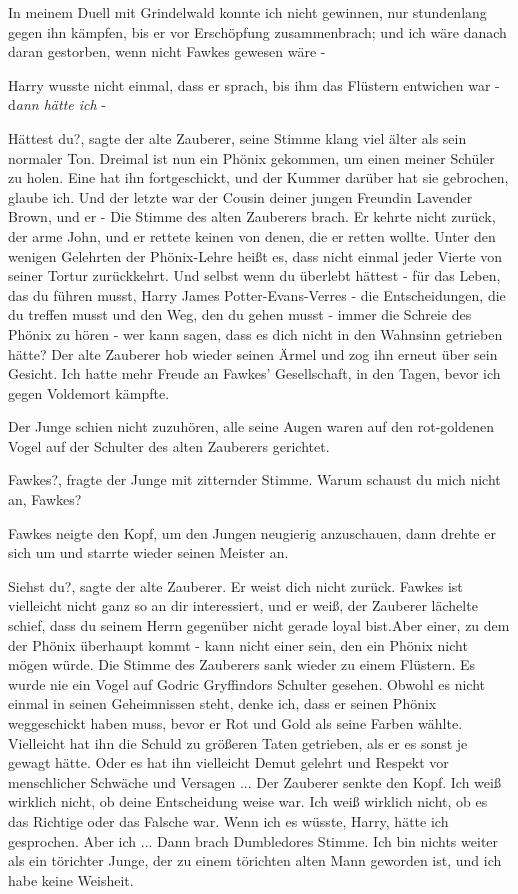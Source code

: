 \glqq{}In meinem Duell mit Grindelwald konnte ich nicht gewinnen, nur stundenlang
gegen ihn kämpfen, bis er vor Erschöpfung zusammenbrach; und ich wäre danach
daran gestorben, wenn nicht Fawkes gewesen wäre -

Harry wusste nicht einmal, dass er sprach, bis ihm das Flüstern entwichen war -
\glqq{}d\emph{ann hätte ich} -\grqq{}

\glqq{}Hättest du?\grqq{}, sagte der alte Zauberer, seine Stimme klang viel älter
als sein normaler Ton. \glqq{}Dreimal ist nun ein Phönix gekommen, um einen
meiner Schüler zu holen. Eine hat ihn fortgeschickt, und der Kummer darüber hat
sie gebrochen, glaube ich. Und der letzte war der Cousin deiner jungen Freundin
Lavender Brown, und er -\grqq{} Die Stimme des alten Zauberers brach. \glqq{}Er
kehrte nicht zurück, der arme John, und er rettete keinen von denen, die er
retten wollte. Unter den wenigen Gelehrten der Phönix-Lehre heißt es, dass nicht
einmal jeder Vierte von seiner Tortur zurückkehrt. Und selbst wenn du überlebt
hättest - für das Leben, das du führen musst, Harry James Potter-Evans-Verres -
die Entscheidungen, die du treffen musst und den Weg, den du gehen musst - immer
die Schreie des Phönix zu hören - wer kann sagen, dass es dich nicht in den
Wahnsinn getrieben hätte?\grqq{} Der alte Zauberer hob wieder seinen Ärmel und
zog ihn erneut über sein Gesicht. \glqq{}Ich hatte mehr Freude an Fawkes'
Gesellschaft, in den Tagen, bevor ich gegen Voldemort kämpfte.\grqq{}

Der Junge schien nicht zuzuhören, alle seine Augen waren auf den rot-goldenen
Vogel auf der Schulter des alten Zauberers gerichtet.

\glqq{}Fawkes?\grqq{}, fragte der Junge mit zitternder Stimme. \glqq{}Warum
schaust du mich nicht an, Fawkes?\grqq{}

Fawkes neigte den Kopf, um den Jungen neugierig anzuschauen, dann drehte er sich
um und starrte wieder seinen Meister an.

\glqq{}Siehst du?\grqq{}, sagte der alte Zauberer. \glqq{}Er weist dich nicht
zurück. Fawkes ist vielleicht nicht ganz so an dir interessiert, und er
weiß\grqq{}, der Zauberer lächelte schief, \glqq{}dass du seinem Herrn gegenüber
nicht gerade loyal bist.Aber einer, zu dem der Phönix überhaupt kommt - kann
nicht einer sein, den ein Phönix nicht mögen würde.\grqq{} Die Stimme des
Zauberers sank wieder zu einem Flüstern. \glqq{}Es wurde nie ein Vogel auf Godric
Gryffindors Schulter gesehen. Obwohl es nicht einmal in seinen Geheimnissen
steht, denke ich, dass er seinen Phönix weggeschickt haben muss, bevor er Rot
und Gold als seine Farben wählte. Vielleicht hat ihn die Schuld zu größeren
Taten getrieben, als er es sonst je gewagt hätte. Oder es hat ihn vielleicht
Demut gelehrt und Respekt vor menschlicher Schwäche und Versagen ...\grqq{} Der
Zauberer senkte den Kopf. \glqq{}Ich weiß wirklich nicht, ob deine Entscheidung
weise war. Ich weiß wirklich nicht, ob es das Richtige oder das Falsche war.
Wenn ich es wüsste, Harry, hätte ich gesprochen. Aber ich ...\grqq{} Dann brach
Dumbledores Stimme. \glqq{}Ich bin nichts weiter als ein törichter Junge, der zu
einem törichten alten Mann geworden ist, und ich habe keine Weisheit.\grqq{}

